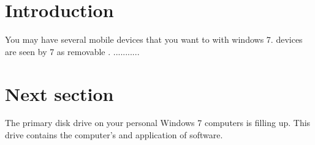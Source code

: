 \documentclass{article}
\begin{document}
\tableofcontents
\section{Introduction}
You may have several mobile devices that you want to
 with windows 7. devices are seen
by  7 as removable .
...........
\section{Next section}
The primary  disk drive on your personal Windows 7
computers is filling up. This drive contains the computer’s
 and application of software.
\printindex
\end{document}
